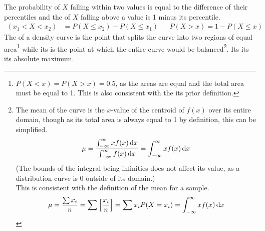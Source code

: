\documentclass[../AP_Statistics.tex]{subfiles}
\begin{document}
			The probability of $X$ falling within two values is equal to the difference of their percentiles and the  of $X$ falling above a value is 1 minus its percentile.
			\begin{align*}
				(x_1 < X < x_2) &= P(X \le x_2) - P(X \le x_1) && P(X > x) = 1 - P(X \le x)
			\end{align*}
			The  of a density curve is the point that splits the curve into two regions of equal area\footnote{$P(X < x) = P(X > x) = 0.5$, as the areas are equal and the total area must be equal to 1. This is also consistent with the its prior definition.} while its  is the point at which the entire curve would be balanced\footnote{The mean of the curve is the $x$-value of the centroid of $f(x)$ over its entire domain, though as its total area is always equal to 1 by definition, this can be simplified.\[\mu = \frac{\int_{-\infty}^\infty xf(x)\,\mathrm{d} x}{\int_{-\infty}^\infty f(x)\,\mathrm{d} x} = \int_{-\infty}^\infty xf(x)\,\mathrm{d} x\](The bounds of the integral being infinities does not affect its value, as a distribution curve is 0 outside of its domain.)\\This is consistent with the definition of the mean for a sample.\[\mu = \frac{\sum x_i}{n} = \sum\left[\frac{x_i}{n}\right] = \sum x_iP(X = x_i) = \int_{-\infty}^\infty xf(x)\,\mathrm{d} x\]}. Its  its its absolute maximum.
\end{document}
